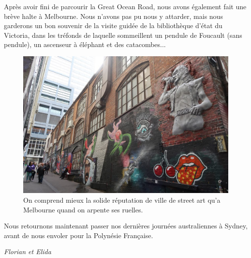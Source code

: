 Après avoir fini de parcourir la Great Ocean Road, nous avons également
fait une brève halte à Melbourne. Nous n'avons pas pu nous y attarder,
mais nous garderons un bon souvenir de la visite guidée de la
bibliothèque d'état du Victoria, dans les tréfonds de laquelle
sommeillent un pendule de Foucault (sans pendule), un ascenseur à
éléphant et des catacombes...

\begin{figure}
\centering
\includegraphics{images/20180731_melbourne.JPG}
\caption{On comprend mieux la solide réputation de ville de street art
qu'a Melbourne quand on arpente ses ruelles.}
\end{figure}

Nous retournons maintenant passer nos dernières journées australiennes à
Sydney, avant de nous envoler pour la Polynésie Française.

\emph{Florian et Elida}
